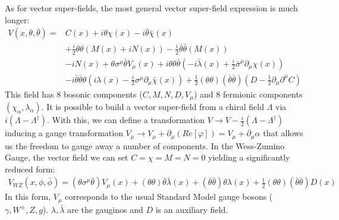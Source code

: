 As for vector super-fields, the most general vector super-field expression is much longer:
\begin{align*}
V(x,\theta, \bar{\theta}) = &C(x) + i\theta \chi(x) - i \bar{\theta} \bar{\chi}(x)\\
&+ \frac{i}{2} \theta\theta (M(x) + iN(x)) - \frac{i}{2} \bar\theta \bar \theta (M(x)) \\
&- i N(x) + \theta\sigma^\mu \bar\theta V_\mu(x) + 
i \theta \theta \bar{\theta} \left ( -i \bar \lambda (x) + \frac{i}{2} \bar{\sigma}^\mu \partial_\mu \chi (x) \right)  \\
&-i \bar \theta \bar \theta \theta \left ( i \lambda (x) - \frac{i}{2} \sigma^\mu \partial_\mu \bar \chi (x) \right) + \frac{1}{2} (\theta\theta)(\bar \theta \bar \theta) \left( D - \frac{1}{2} \partial_\mu \partial^\mu C \right) 
\end{align*}
This field has 8 bosonic components ($C,M,N,D,V_\mu$) and 8 fermionic components $(\chi_\alpha, \lambda_\alpha)$.  
It is possible to build a vector super-field from a chiral field $\Lambda$ via $i(\Lambda - \Lambda^\dagger)$. 
With this, we can define a transformation $V \rightarrow V - \frac{i}{2}(\Lambda - \Lambda^\dagger)$ inducing a gauge 
transformation $V_\mu \rightarrow V_\mu + \partial_\mu (Re[\varphi]) = V_\mu + \partial_\mu \alpha$ that allows us the freedom to gauge away a number of components. In the Wess-Zumino Gauge, the vector field we can set $C = \chi = M = N = 0$ yielding a significantly reduced form:
\begin{align*}
V_{WZ} (x,\phi,\bar \phi) = (\theta \sigma^\mu \bar \theta) V_\mu (x) + (\theta\theta)\bar \theta \bar \lambda (x) 
+ (\bar \theta \bar \theta) \theta \lambda (x) + \frac{1}{2} ( \theta \theta) (\bar \theta \bar \theta) D(x) 
\end{align*}
In this form, $V_\mu$ corresponds to the usual Standard Model gauge bosons ($\gamma, W^\pm, Z, g$). $\lambda,\bar \lambda$
are the gauginos and $D$ is an auxiliary field. 

